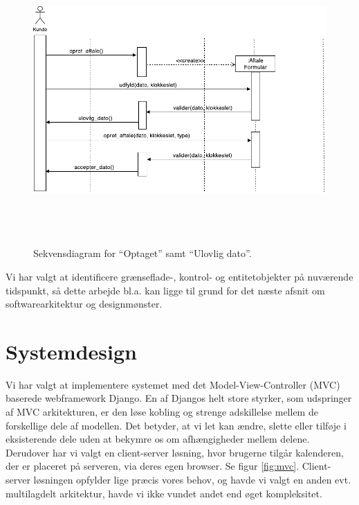 \documentclass[12pt]{article}   %
\begin{document}
\begin{figure}[!ht]
\begin{center}
\includegraphics[width=14cm, height=11cm]{extend.pdf}
\caption{Sekvensdiagram for ``Optaget'' samt  ``Ulovlig dato''.}
\label{fig:extseq}
\end{center}
\end{figure}

Vi har valgt at identificere grænseflade-, kontrol- og entitetobjekter på nuværende tidspunkt, så dette arbejde bl.a. kan ligge til grund for det næste afsnit om softwarearkitektur og designmønster. 

\section{Systemdesign}

Vi har valgt at implementere systemet med det Model-View-Controller (MVC) baserede webframework Django.  En af Djangos helt store styrker, som udspringer af MVC arkitekturen, er den løse kobling og strenge adskillelse mellem de forskellige dele af modellen. Det betyder, at vi let kan ændre, slette eller tilføje i eksisterende dele uden at bekymre os om afhængigheder mellem delene.\\ \indent Derudover har vi valgt en client-server løsning, hvor brugerne tilgår kalenderen, der er placeret på serveren, via deres egen browser. Se figur \ref{fig:mvc}. Client-server løsningen opfylder lige præcis vores behov, og havde vi valgt en anden evt. multilagdelt arkitektur, havde vi ikke vundet andet end øget kompleksitet.
\end{document}
